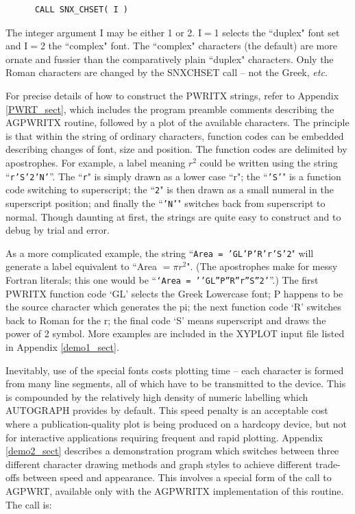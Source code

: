 \documentclass[twoside,11pt]{article}
\renewcommand{\_}{\texttt{\symbol{95}}}
\begin{document}
\begin{verbatim}
      CALL SNX_CHSET( I )
\end{verbatim}

The integer argument I may be either 1 or 2.
I$=$1 selects the ``duplex" font set and I$=$2 the ``complex" font.
The ``complex" characters (the default) are more ornate and
fussier than the comparatively plain ``duplex" characters.
Only the Roman characters are changed by the SNX\_CHSET call --
not the Greek, {\em etc.}

For precise details of how to construct the PWRITX strings, refer to Appendix
\ref{PWRT_sect}, which includes the program preamble comments describing the
AGPWRITX routine, followed by a plot of the available characters.
The principle is that within the string of ordinary characters, function codes
can be embedded describing changes of font, size and position.
The function codes are delimited by apostrophes.
For example, a label meaning $r^{2}$ could be written using the string
``{\tt r'S'2'N'}''.
The ``{\tt r}" is simply drawn as a lower case ``r"; the ``{\tt 'S'}" is a
function code switching to superscript; the ``{\tt 2}" is then drawn as a small
numeral in the superscript position; and finally the ``{\tt 'N'}" switches back
from superscript to normal.
Though daunting at first, the strings are quite easy to construct and to debug
by trial and error.

As a more complicated
example, the string ``{\tt Area = 'GL'P'R'r'S'2}" will generate a label
equivalent to ``Area $=\pi r^{2}$".
(The apostrophes make for messy Fortran literals; this one would be
``{\tt `Area = ''GL''P''R''r''S''2'}''.)
The first PWRITX function code `GL' selects the Greek Lowercase
font;  P happens to be the source character which generates the
pi;  the next function code `R' switches back to Roman for the
r;  the final code `S' means superscript and draws the power of 2 symbol.
More examples are included in the XYPLOT input file listed in Appendix
\ref{demo1_sect}.

Inevitably, use of the special fonts costs plotting time -- each
character is formed from many line segments, all of which have
to be transmitted to the device.
This is compounded by the relatively high density of
numeric labelling which AUTOGRAPH provides by default.
This speed penalty is an acceptable cost where a publication-quality
plot is being produced on a hardcopy device, but not for
interactive applications requiring frequent and rapid plotting.
Appendix \ref{demo2_sect} describes a demonstration program which
switches between three different character drawing
methods and graph styles to achieve different trade-offs
between speed and appearance.
This involves a special form of the call to AGPWRT, available
only with the AGPWRITX implementation of this routine.
The call is:
\end{document}
